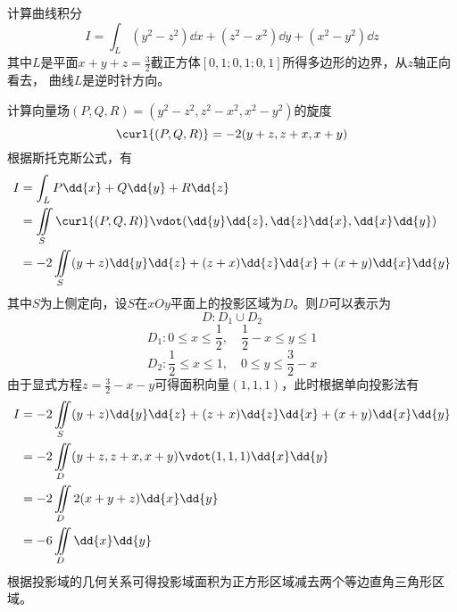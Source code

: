 \begin{example}
    计算曲线积分
    \[ I = \int_L (y^2-z^2)\dd{x} + (z^2-x^2)\dd{y} + (x^2-y^2)\dd{z} \]
    其中$L$是平面$x+y+z=\frac{3}{2}$截正方体$[0,1;0,1;0,1]$所得多边形的边界，从$z$轴正向看去，
    曲线$L$是逆时针方向。
\end{example}
\begin{solution}
    计算向量场$(P,Q,R)=(y^2-z^2, z^2-x^2, x^2-y^2)$的旋度
    \[ \curl{(P,Q,R)} = -2(y+z, z+x, x+y) \]
    根据斯托克斯公式，有
    \begin{align*}
        I & = \int_L P\dd{x} + Q\dd{y} + R\dd{z}                                         \\
          & = \iint\limits_S \curl{(P,Q,R)}\vdot(\dd{y}\dd{z},\dd{z}\dd{x},\dd{x}\dd{y}) \\
          & = -2\iint\limits_S (y+z)\dd{y}\dd{z} + (z+x)\dd{z}\dd{x} + (x+y)\dd{x}\dd{y}
    \end{align*}
    其中$S$为上侧定向，设$S$在$xOy$平面上的投影区域为$D$。则$D$可以表示为
    \[ D: D_1 \cup D_2 \]
    \[ D_1 : 0\leq x\leq \frac{1}{2},\quad \frac{1}{2} - x \leq y \leq 1  \]
    \[ D_2 : \frac{1}{2}\leq x\leq 1,\quad 0 \leq y \leq \frac{3}{2} - x  \]
    由于显式方程$z=\frac{3}{2}-x-y$可得面积向量$(1,1,1)$，此时根据单向投影法有
    \begin{align*}
        I & = -2\iint\limits_S (y+z)\dd{y}\dd{z} + (z+x)\dd{z}\dd{x} + (x+y)\dd{x}\dd{y} \\
          & =-2\iint\limits_D (y+z,z+x,x+y)\vdot(1,1,1)\dd{x}\dd{y}                      \\
          & =-2\iint\limits_D 2(x+y+z)\dd{x}\dd{y}                                       \\
          & =-6\iint\limits_D\dd{x}\dd{y}
    \end{align*}
    根据投影域的几何关系可得投影域面积为正方形区域减去两个等边直角三角形区域。
    \begin{figure}[H]
        \centering
\end{figure}
\end{solution}
